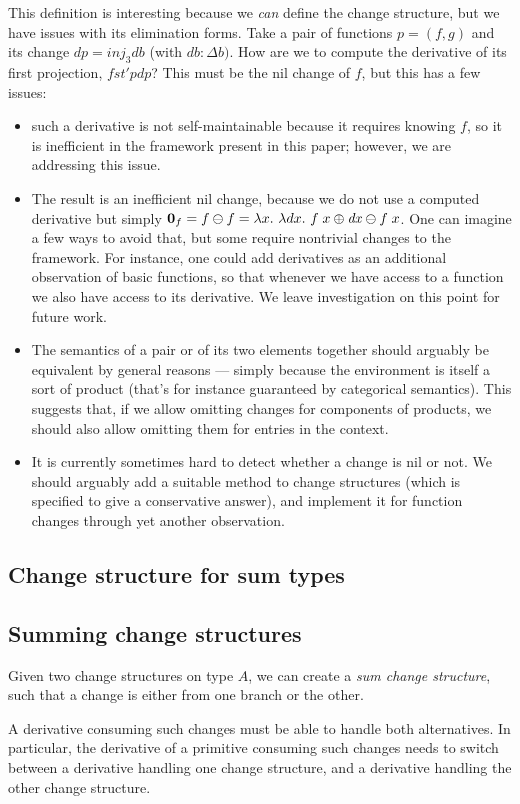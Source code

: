 This definition is interesting because we \emph{can} define the
change structure, but we have issues with its elimination forms.
Take a pair of functions $p = (f, g)$ and its change
$dp = \mathit{inj}_3 db$ (with $db : \Delta b)$. How are we to
compute the derivative of its first projection, $fst' p dp$? This
must be the nil change of $f$, but this has a few issues:
\begin{itemize}
\item such a derivative is not self-maintainable because it
  requires knowing $f$, so it is inefficient in the framework
  present in this paper; however, we are addressing this issue.
\item The result is an inefficient nil change, because we do not
  use a computed derivative but simply
  $\NilC{f} = \Diff{f}{f} = \Lam{x}{\Lam{dx}{\Diff{\App{f}{\Update
          x {\D{x}}}}{\App{f}{x}}}}$. One can imagine a few ways
  to avoid that, but some require nontrivial changes to the
  framework. For instance, one could add derivatives as an
  additional observation of basic functions, so that whenever we
  have access to a function we also have access to its
  derivative. We leave investigation on this point for future
  work.
\item The semantics of a pair or of its two elements together
  should arguably be equivalent by general reasons --- simply
  because the environment is itself a sort of product (that's for
  instance guaranteed by categorical semantics). This suggests
  that, if we allow omitting changes for components of products,
  we should also allow omitting them for entries in the context.
\item It is currently sometimes hard to detect whether a change
  is nil or not. We should arguably add a suitable method to
  change structures (which is specified to give a conservative
  answer), and implement it for function changes through yet
  another observation.
\end{itemize}

\subsection{Change structure for sum types}

\subsection{Summing change structures}
Given two change structures on type $A$, we can create a
\emph{sum change structure}, such that a change is either from
one branch or the other.

A derivative consuming such changes must be able to handle both
alternatives. In particular, the derivative of a primitive
consuming such changes needs to switch between a derivative
handling one change structure, and a derivative handling the
other change structure.%
